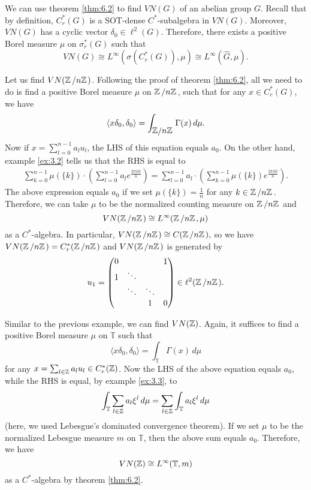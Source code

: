 We can use theorem \ref{thm:6.2} to find $VN(G)$ of an abelian group $G$.
Recall that by definition, $C_r ^* (G)$ is a SOT-dense $C^*$-subalgebra in $VN(G)$.
Moreover, $VN(G)$ has a cyclic vector $\delta_0 \in \ell^2 (G)$.
Therefore, there exists a positive Borel measure $\mu$ on $\sigma_r ^* (G)$ such that $$VN(G) \cong L^\infty (\sigma (C_r ^* (G)), \mu) \cong L^\infty (\widehat{G}, \mu).$$

\begin{example}
  Let us find $VN(\quot{\Z}{n\Z})$.
  Following the proof of theorem \ref{thm:6.2}, all we need to do is find a positive Borel measure $\mu$ on $\quot{\Z}{n\Z}$, such that for any $x \in C_r ^* (G)$, we have
  $$\langle x \delta_0, \delta_0 \rangle = \int_{\quot{\mathbb{Z}}{n\mathbb{Z}}} \Gamma (x)\, d\mu.$$
  Now if $x = \sum_{l = 0} ^{n - 1} a_l u_l$, the LHS of this equation equals $a_0$.
  On the other hand, example \ref{ex:3.2} tells us that the RHS is equal to 
  \begin{align*}
    \sum_{k = 0} ^{n - 1} \mu (\{k\}) \cdot \left(\sum_{l = 0} ^{n - 1} a_l e^{\frac{2 \pi i k l}{n}}\right) = \sum_{l = 0} ^{n - 1} a_l \cdot \left(\sum_{k = 0} ^{n - 1} \mu (\{k\})  e^{\frac{2 \pi i k l}{n}}\right).
  \end{align*}
  The above expression equals $a_0$ if we set $\mu (\{k\}) = \frac{1}{n}$ for any $k \in \quot{\Z}{n\Z}$.
  Therefore, we can take $\mu$ to be the normalized counting measure on $\quot{\Z}{n\Z}$ and 
  $$VN(\quot{\Z}{n\Z}) \cong L^\infty (\quot{\Z}{n\Z}, \mu)$$
  as a $C^*$-algebra. In particular, $VN(\quot{\Z}{n\Z}) \cong C(\quot{\Z}{n\Z}),$
  so we have $VN(\quot{\Z}{n\Z}) = C_r ^* (\quot{\Z}{n\Z})$ and $VN(\quot{\Z}{n\Z})$ is generated by 
  $$u_1 = \begin{pmatrix}
    0 &  & & 1\\
    1 & \ddots && \\
      & \ddots & \ddots & \\
     & & 1 & 0
  \end{pmatrix} \in \ell^2 (\quot{\Z}{n\Z}).$$
\end{example}

\begin{example} 
  Similar to the previous example, we can find $VN(\mathbb {Z})$.
  Again, it suffices to find a positive Borel measure $\mu$ on $\mathbb{T}$ such that 
  $$\langle x \delta_0, \delta_0 \rangle = \int_{\mathbb{T}} \Gamma (x)\, d\mu$$
  for any $x = \sum_{l \in \mathbb {Z}} a_l u_l \in C_r ^* (\mathbb {Z})$. Now the LHS of the above equation equals $a_0$,
  while the RHS is equal, by example \ref{ex:3.3}, to 
  $$\int_{\mathbb{T}} \sum_{l \in \mathbb {Z}} a_l \xi^l\, d\mu = \sum_{l \in \mathbb {Z}} \int_{\mathbb{T}} a_l \xi^l \, d\mu$$
  (here, we used Lebesgue's dominated convergence theorem).
  If we set $\mu$ to be the normalized Lebesgue measure $m$ on $\mathbb{T}$, then the above sum equals $a_0$.
  Therefore, we have 
  $$VN(\mathbb {Z}) \cong L^\infty (\mathbb{T}, m)$$
  as a $C^*$-algebra by theorem \ref{thm:6.2}.
\end{example}

